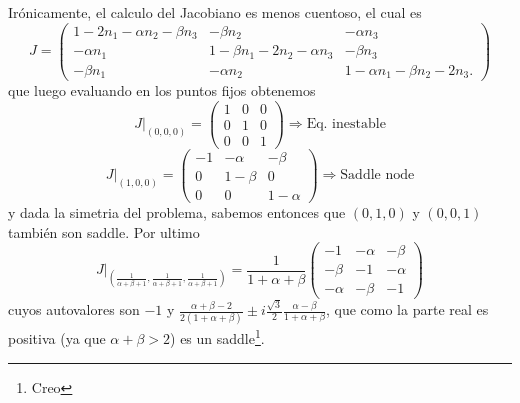 Irónicamente, el calculo del Jacobiano es menos cuentoso, el cual es
\begin{equation}
    J =
    \begin{pmatrix}
        1-2n_1-\alpha n_2 -\beta n_3    & -\beta n_2                        & -\alpha n_3  \\[6pt]
        -\alpha n_1                     & 1-\beta n_1 -2 n_2 -\alpha n_3    & -\beta n_3\\[6pt]
        -\beta n_1                      & -\alpha n_2                       & 1- \alpha n_1 -\beta n_2 -2n_3. 
    \end{pmatrix}
\end{equation}
que luego evaluando en los puntos fijos obtenemos
\begin{equation}
    J |_{\left(0,0,0\right)}=
    \begin{pmatrix}
        1   & 0     & 0 \\[6pt]
        0   & 1     & 0 \\[6pt]
        0   & 0     & 1
    \end{pmatrix}
    \Rightarrow \text{Eq. inestable} 
\end{equation}
\begin{equation}
    J |_{\left(1,0,0\right)}=
    \begin{pmatrix}
        -1   & -\alpha      & -\beta \\[6pt]
        0    & 1-\beta      & 0 \\[6pt]
        0    & 0            & 1-\alpha
    \end{pmatrix}
    \Rightarrow \text{Saddle node} 
\end{equation}
y dada la simetria del problema, sabemos entonces que $\left(0,1,0\right)$ y $\left(0,0,1\right)$ también son saddle. Por ultimo
\begin{equation}
    J |_{\left(\frac{1}{\alpha + \beta + 1},\frac{1}{\alpha + \beta + 1},\frac{1}{\alpha + \beta + 1}\right)}= \frac{1}{1+\alpha+\beta}
    \begin{pmatrix}
        -1          & -\alpha   & -\beta \\[6pt]
        -\beta      & -1        & -\alpha \\[6pt]
        -\alpha     & -\beta    & -1
    \end{pmatrix}
\end{equation}
cuyos autovalores son $-1$ y $\frac{\alpha +\beta -2}{2 \left(1+\alpha+\beta\right)} \pm i \frac{\sqrt{3}}{2} \frac{\alpha - \beta}{1+\alpha+\beta}$, que como la parte real es positiva (ya que $\alpha+\beta > 2$) es un saddle\footnote{Creo}.